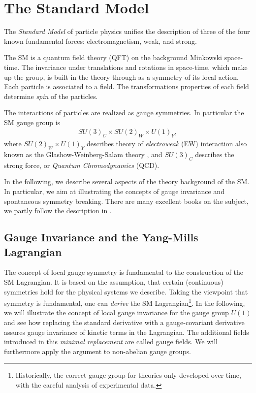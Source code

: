 
\section{The Standard Model}


The \emph{Standard Model} of particle physics unifies the description of three of the
four known fundamental forces: electromagnetism, weak, and strong.

The SM is a quantum field theory (QFT) on the background Minkowski space-time.
The invariance under translations and rotations in space-time, which make up
the \poinc group, is built in the theory through as a symmetry of its local
action. Each particle is associated to a field. The transformations properties of
each field determine \emph{spin} of the particles.

The interactions of particles are realized as gauge symmetries.
In particular the SM gauge group is
\begin{align}\label{eq:SMgauge}
  SU(3)_C\times SU(2)_W \times U(1)_Y,
\end{align}
where $SU(2)_W \times U(1)_Y$ describes theory of \emph{electroweak} (EW)
interaction also known as the Glashow-Weinberg-Salam theory \cite{Glashow1961a,Weinberg1967a,Salam1968,Glashow1970},
and $SU(3)_C$ describes the strong force, or \emph{Quantum Chromodynamics} (QCD).


In the following, we describe several aspects of the theory background of the
SM. In particular, we aim at illustrating the concepts of gauge
invariance and spontaneous symmetry breaking. There are many
excellent books on the subject, we partly follow the description in \cite{PeskinS,Schwartz:2013pla}.

\subsection{Gauge Invariance and the Yang-Mills Lagrangian}
\label{sec:giym}
The concept of local gauge symmetry is fundamental to the construction
of the SM Lagrangian. It is based on the assumption, that
certain (continuous) symmetries hold for the physical systems we
describe. Taking the viewpoint that symmetry
is fundamental, one can \textit{derive} the SM Lagrangian\footnote{Historically, the correct gauge group for
  theories only developed over time, with the careful analysis of
  experimental data.}. In the following, we will
illustrate the concept of local gauge invariance for the gauge group
$U(1)$ and see how replacing
the standard derivative with a gauge-covariant derivative assures gauge invariance of kinetic terms in
the Lagrangian. The additional fields introduced in this \textit{minimal
  replacement} are called gauge fields. We will furthermore apply the argument to
non-abelian gauge groups.

